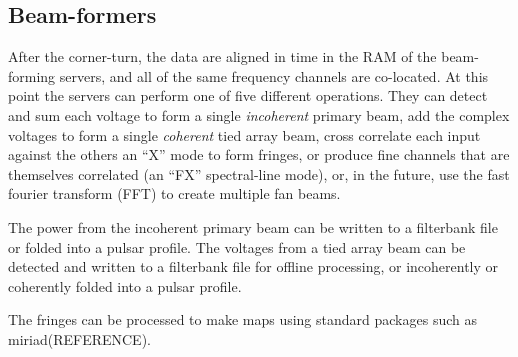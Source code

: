 \subsection{Beam-formers}

After the corner-turn, the data are aligned in time in the RAM of the beam-forming servers, and all of the same frequency channels are co-located. At this point the servers can perform one of five different operations. They can detect and sum each voltage to form a single \textit{incoherent} primary beam, add the complex voltages to form a single \textit{coherent} tied array beam, cross correlate each input against the others an ``X'' mode to form fringes, or produce fine channels that are themselves correlated (an ``FX'' spectral-line mode), or, in the future, use the fast fourier transform (FFT) to create multiple fan beams. 

The power from the incoherent primary beam can be written to a filterbank file or folded into a pulsar profile. The voltages from a tied array beam can be detected and written to a filterbank file for offline processing, or incoherently or coherently folded into a pulsar profile.

The fringes can be processed to make maps using standard packages such as miriad(REFERENCE). 